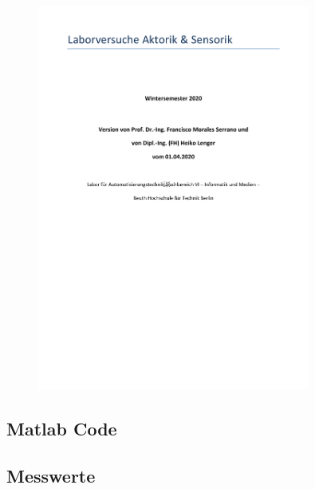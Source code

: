 \begin{figure}[H]
    \centering
    \includegraphics[page=4, width=0.8\textwidth]{../Aufgabenstellung.pdf}
    \label{fig:Aufgabenstellung A1}
\end{figure}

\subsection{Matlab Code}





\subsection{Messwerte}

